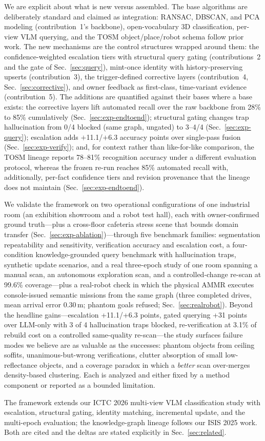 We are explicit about what is new versus assembled. The base algorithms
are deliberately standard and claimed as integration: RANSAC, DBSCAN, and
PCA modeling (contribution~1's backbone), open-vocabulary 3D
classification, per-view VLM querying, and the TOSM
object/place/robot schema follow prior work. The new mechanisms are the
control structures wrapped around them: the confidence-weighted
escalation tiers with structural query gating (contributions~2 and the
gate of Sec.~\ref{sec:query}), mint-once identity with history-preserving
upserts (contribution~3), the trigger-defined corrective layers
(contribution~4, Sec.~\ref{sec:corrective}), and owner feedback as
first-class, time-variant evidence (contribution~5). The additions are
quantified against their bases where a base exists: the corrective layers
lift automated recall over the raw backbone from 28\% to 85\%
cumulatively (Sec.~\ref{sec:exp-endtoend}); structural gating changes
trap hallucination from 0/4 blocked (same graph, ungated) to 3--4/4
(Sec.~\ref{sec:exp-query}); escalation adds $+$11.1/$+$6.3 accuracy
points over single-pass fusion (Sec.~\ref{sec:exp-verify}); and, for context
rather than like-for-like comparison, the TOSM lineage reports 78--81\%
recognition accuracy under a different evaluation protocol, whereas the
frozen re-run reaches 85\% automated recall with, additionally, per-fact
confidence tiers and revision provenance that the lineage does not
maintain (Sec.~\ref{sec:exp-endtoend}).

We validate the framework on two operational configurations of one
industrial room (an exhibition showroom and a robot test hall), each with
owner-confirmed ground truth---plus a cross-floor cafeteria stress scene
that bounds domain transfer (Sec.~\ref{sec:exp-ablation})---through five
benchmark families: segmentation
repeatability and sensitivity, verification accuracy and escalation cost, a
four-condition knowledge-grounded query benchmark with hallucination traps,
synthetic update scenarios, and a real three-epoch study of one room spanning
a manual scan, an autonomous exploration scan, and a controlled-change
re-scan at 99.6\% coverage---plus a real-robot check in which the
physical AMMR executes console-issued semantic missions from the same
graph (three completed drives, mean arrival error 0.30\,m; phantom goals
refused; Sec.~\ref{sec:realrobot}). Beyond the headline gains---escalation
+11.1/+6.3 points, gated querying +31 points over LLM-only with 3 of 4
hallucination traps blocked,
re-verification at 3.1\% of rebuild cost on a controlled same-quality
re-scan---the study surfaces
failure modes we believe are as valuable as the successes: phantom objects
from ceiling soffits, unanimous-but-wrong verifications, clutter absorption
of small low-reflectance objects, and a coverage paradox in which a
\emph{better} scan over-merges density-based clustering. Each is analyzed
and either fixed by a method component or reported as a bounded limitation.

The framework extends our ICTC 2026 multi-view VLM classification study with
escalation, structural gating, identity matching, incremental update, and
the multi-epoch evaluation; the knowledge-graph lineage follows our ISIS 2025
work. Both are cited and the deltas are stated explicitly in
Sec.~\ref{sec:related}.
